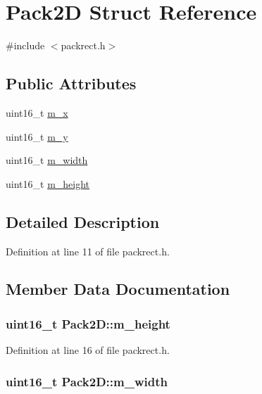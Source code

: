 \hypertarget{struct_pack2_d}{\section{Pack2\+D Struct Reference}
\label{struct_pack2_d}
}


{\ttfamily \#include $<$packrect.\+h$>$}

\subsection*{Public Attributes}
\begin{DoxyCompactItemize}
\item 
uint16\+\_\+t \hyperlink{struct_pack2_d_af33f3d953ee7c8259da95c9b2d7caca8}{m\+\_\+x}
\item 
uint16\+\_\+t \hyperlink{struct_pack2_d_ac81ac16b77051195d5370eb867d205a7}{m\+\_\+y}
\item 
uint16\+\_\+t \hyperlink{struct_pack2_d_a20f1fa2cffb5cb27c0ec0ca160cfe02b}{m\+\_\+width}
\item 
uint16\+\_\+t \hyperlink{struct_pack2_d_a985134f7e99bcdebdc135f4170af76be}{m\+\_\+height}
\end{DoxyCompactItemize}


\subsection{Detailed Description}


Definition at line 11 of file packrect.\+h.



\subsection{Member Data Documentation}
\hypertarget{struct_pack2_d_a985134f7e99bcdebdc135f4170af76be}{
\subsubsection[{m\+\_\+height}]{\setlength{\rightskip}{0pt plus 5cm}uint16\+\_\+t Pack2\+D\+::m\+\_\+height}}\label{struct_pack2_d_a985134f7e99bcdebdc135f4170af76be}


Definition at line 16 of file packrect.\+h.

\hypertarget{struct_pack2_d_a20f1fa2cffb5cb27c0ec0ca160cfe02b}{
\subsubsection[{m\+\_\+width}]{\setlength{\rightskip}{0pt plus 5cm}uint16\+\_\+t Pack2\+D\+::m\+\_\+width}}\label{struct_pack2_d_a20f1fa2cffb5cb27c0ec0ca160cfe02b}


